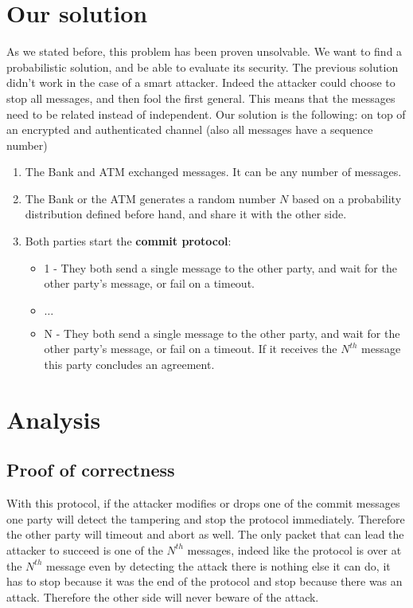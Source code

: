 \documentclass[10pt,letterpaper]{article}
\begin{document}
\begin{multicols}{2}
\section{Our solution}

As we stated before, this problem has been proven unsolvable. We want to find a probabilistic solution, and be able to evaluate its security. The previous solution didn't work in the case of a smart attacker.
Indeed the attacker could choose to stop all messages, and then fool the first general. This means that the messages need to be related instead of independent. Our solution is the following: on top of an encrypted and
authenticated channel (also all messages have a sequence number)

\begin{enumerate}
 \item The Bank and ATM exchanged messages. It can be any number of messages.
 \item The Bank or the ATM generates a random number $N$ based on a probability distribution defined before hand, and share it with the other side.
 \item Both parties start the \textbf{commit protocol}:
 \begin{itemize}
  \item 1 - They both send a single message to the other party, and wait for the other party's message, or fail on a timeout.
  \item $\dots$
  \item N - They both send a single message to the other party, and wait for the other party's message, or fail on a timeout. If it receives the $N^{th}$ message this party concludes an agreement.
 \end{itemize}
\end{enumerate}

\section{Analysis}

\subsection{Proof of correctness}

With this protocol, if the attacker modifies or drops one of the commit messages one party will detect the tampering and stop the protocol immediately. Therefore the other party will timeout and abort as well.
The only packet that can lead the attacker to succeed is one of the $N^{th}$ messages, indeed like the protocol is over at the $N^{th}$ message even by detecting the attack there is nothing else it can do, it has to
stop because it was the end of the protocol and stop because there was an attack. Therefore the other side will never beware of the attack.


\end{multicols}
\end{document}
